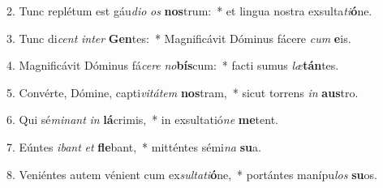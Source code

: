 2. Tunc replétum est gáu\textit{di}\textit{o} \textit{os} \textbf{nos}trum:~*  et lingua nostra exsulta\textit{ti}\textbf{ó}ne.\

3. Tunc di\textit{cent} \textit{in}\textit{ter} \textbf{Gen}tes:~*  Magnificávit Dóminus fácere \textit{cum} \textbf{e}is.\

4. Magnificávit Dóminus fá\textit{ce}\textit{re} \textit{no}\textbf{bís}cum:~*  facti sumus \textit{læ}\textbf{tán}tes.\

5. Convérte, Dómine, capti\textit{vi}\textit{tá}\textit{tem} \textbf{nos}tram,~*  sicut torrens \textit{in} \textbf{aus}tro.\

6. Qui sé\textit{mi}\textit{nant} \textit{in} \textbf{lá}crimis,~*  in exsultatió\textit{ne} \textbf{me}tent.\

7. Eúntes \textit{i}\textit{bant} \textit{et} \textbf{fle}bant,~*  mitténtes sémi\textit{na} \textbf{su}a.\

8. Veniéntes autem vénient cum ex\textit{sul}\textit{ta}\textit{ti}\textbf{ó}ne,~*  portántes manípu\textit{los} \textbf{su}os.\

